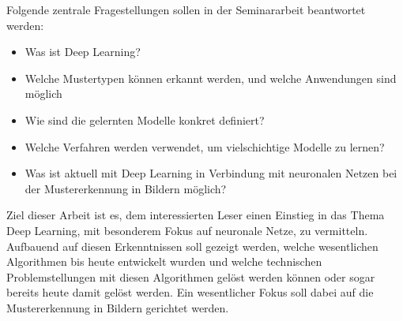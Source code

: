 Folgende zentrale Fragestellungen sollen in der Seminararbeit beantwortet werden:
\begin{itemize}
\item Was ist Deep Learning?
\item Welche Mustertypen können erkannt werden, und welche Anwendungen sind möglich
\item Wie sind die gelernten Modelle konkret definiert?
\item Welche Verfahren werden verwendet, um vielschichtige Modelle zu lernen?
\item Was ist aktuell mit Deep Learning in Verbindung mit neuronalen Netzen bei der Mustererkennung in Bildern möglich?
\end{itemize}

Ziel dieser Arbeit ist es, dem interessierten Leser einen Einstieg in das Thema Deep Learning, mit besonderem Fokus auf neuronale Netze, zu vermitteln. Aufbauend auf diesen Erkenntnissen soll gezeigt werden, welche wesentlichen Algorithmen bis heute entwickelt wurden und welche technischen Problemstellungen mit diesen Algorithmen gelöst werden können oder sogar bereits heute damit gelöst werden. Ein wesentlicher Fokus soll dabei auf die Mustererkennung in Bildern gerichtet werden.



